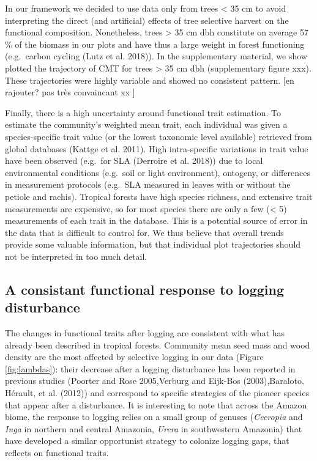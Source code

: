 \documentclass[]{elsarticle} %
\begin{document}
In our framework we decided to use data only from trees \textless{} 35
cm to avoid interpreting the direct (and artificial) effects of tree
selective harvest on the functional composition. Nonetheless, trees
\textgreater{} 35 cm dbh constitute on average 57 \% of the biomass in
our plots and have thus a large weight in forest functioning
(e.g.~carbon cycling (Lutz et al. 2018)). In the supplementary material,
we show plotted the trajectory of CMT for trees \textgreater{} 35 cm dbh
(supplementary figure xxx). These trajectories were highly variable and
showed no consistent pattern. {[}en rajouter? pas très convaincant xx
{]}

Finally, there is a high uncertainty around functional trait estimation.
To estimate the community's weighted mean trait, each individual was
given a species-specific trait value (or the lowest taxonomic level
available) retrieved from global databases (Kattge et al. 2011). High
intra-specific variations in trait value have been observed (e.g.~for
SLA (Derroire et al. 2018)) due to local environmental conditions
(e.g.~soil or light environment), ontogeny, or differences in
measurement protocols (e.g.~SLA measured in leaves with or without the
petiole and rachis). Tropical forests have high species richness, and
extensive trait measurements are expensive, so for most species there
are only a few (\textless{} 5) measurements of each trait in the
database. This is a potential source of error in the data that is
difficult to control for. We thus believe that overall trends provide
some valuable information, but that individual plot trajectories should
not be interpreted in too much detail.

\subsection{A consistant functional response to logging
disturbance}\label{a-consistant-functional-response-to-logging-disturbance}

The changes in functional traits after logging are consistent with what
has already been described in tropical forests. Community mean seed mass
and wood density are the most affected by selective logging in our data
(Figure \ref{fig:lambdas}): their decrease after a logging disturbance
has been reported in previous studies (Poorter and Rose 2005,Verburg and
Eijk-Bos (2003),Baraloto, Hérault, et al. (2012)) and correspond to
specific strategies of the pioneer species that appear after a
disturbance. It is interesting to note that across the Amazon biome, the
response to logging relies on a small group of genuses (\emph{Cecropia}
and \emph{Inga} in northern and central Amazonia, \emph{Urera} in
southwestern Amazonia) that have developed a similar opportunist
strategy to colonize logging gaps, that reflects on functional traits.
\end{document}
